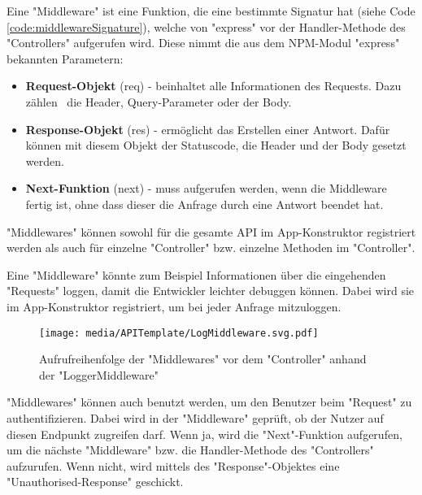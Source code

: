 \label{sec:middleware}

Eine "Middleware" ist eine Funktion, die eine bestimmte Signatur hat (siehe Code \ref{code:middlewareSignature}), welche von "express" vor der Handler-Methode des "Controllers" aufgerufen wird. 
Diese nimmt die aus dem NPM-Modul "express" bekannten Parametern:

    \begin{itemize}
        \item \textbf{Request-Objekt} ({\ttfamily req}) - beinhaltet alle Informationen des Requests. Dazu zählen \zb\ die Header, Query-Parameter oder der Body.
        \item \textbf{Response-Objekt} ({\ttfamily res}) - ermöglicht das Erstellen einer Antwort. Dafür können mit diesem Objekt der Statuscode, die Header und der Body gesetzt werden.
        \item \textbf{Next-Funktion} ({\ttfamily next}) - muss aufgerufen werden, wenn die Middleware fertig ist, ohne dass dieser die Anfrage durch eine Antwort beendet hat.
    \end{itemize}


"Middlewares" können sowohl für die gesamte API im App-Konstruktor registriert werden als auch für einzelne "Controller" bzw. einzelne Methoden im "Controller". 



Eine "Middleware" könnte zum Beispiel Informationen über die eingehenden "Requests" loggen, damit die Entwickler leichter debuggen können. 
Dabei wird sie im \linebreak App-Konstruktor registriert, um bei jeder Anfrage mitzuloggen. 

\begin{figure}[H]
    \centering
    \texttt{[image: media/APITemplate/LogMiddleware.svg.pdf]}
    \caption{Aufrufreihenfolge der "Middlewares" vor dem "Controller" anhand der "LoggerMiddleware"} 
\end{figure}


"Middlewares" können auch benutzt werden, um den Benutzer beim "Request" zu authentifizieren. 
Dabei wird in der "Middleware" geprüft, ob der Nutzer auf diesen Endpunkt zugreifen darf. Wenn ja, wird die "Next"-Funktion aufgerufen, um die nächste "Middleware" bzw. die Handler-Methode des "Controllers" aufzurufen. Wenn nicht, wird mittels des "Response"-Objektes eine "Unauthorised-Response" geschickt.

